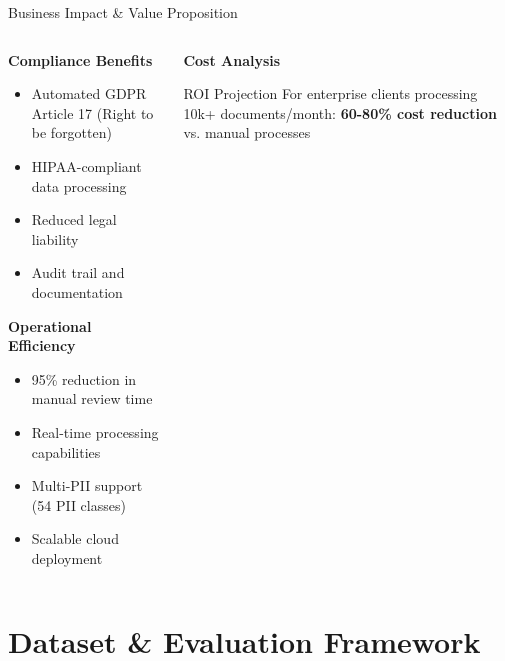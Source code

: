 \documentclass[aspectratio=169]{beamer}
\begin{document}
\begin{frame}{Business Impact \& Value Proposition}
\begin{columns}
\begin{column}{0.5\textwidth}
\textbf{Compliance Benefits}
\begin{itemize}
\item Automated GDPR Article 17 (Right to be forgotten)
\item HIPAA-compliant data processing
\item Reduced legal liability
\item Audit trail and documentation
\end{itemize}

\textbf{Operational Efficiency}
\begin{itemize}
\item 95\% reduction in manual review time
\item Real-time processing capabilities
\item Multi-PII support (54 PII classes)
\item Scalable cloud deployment
\end{itemize}
\end{column}
\begin{column}{0.5\textwidth}
\textbf{Cost Analysis}

\vspace{0.3cm}
\begin{alertblock}{ROI Projection}
For enterprise clients processing 10k+ documents/month:
\textbf{60-80\% cost reduction} vs. manual processes
\end{alertblock}
\end{column}
\end{columns}
\end{frame}

\section{Dataset \& Evaluation Framework}
\end{document}

